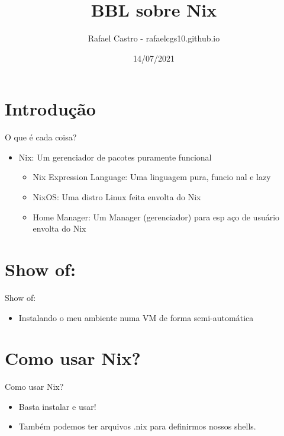 \documentclass[presentation]{beamer}
\author{Rafael Castro - rafaelcgs10.github.io}
\date{14/07/2021}
\title{BBL sobre Nix}
\begin{document}
\maketitle

\section{Introdução}
\label{sec:org8436435}

\begin{frame}[label={sec:org235ec10}]{O que é cada coisa?}
\begin{itemize}
\item Nix: Um gerenciador de pacotes \alert{puramente funcional}
\begin{itemize}
\item Nix Expression Language: Uma linguagem pura, funcio  nal e lazy
\item NixOS: Uma distro Linux feita envolta do Nix
\item Home Manager: Um Manager (gerenciador) para esp    aço de usuário   envolta do Nix
\end{itemize}
\end{itemize}
\end{frame}

\section{Show of:}
\label{sec:orgf655336}

\begin{frame}[label={sec:org1629316}]{Show of:}
\begin{itemize}
\item Instalando o meu ambiente numa VM de forma semi-automática
\end{itemize}
\end{frame}

\section{Como usar Nix?}
\label{sec:orged75924}

\begin{frame}[label={sec:org6c9e8aa}]{Como usar Nix?}
\begin{itemize}
\item Basta instalar e usar!
\item Também podemos ter arquivos .nix para definirmos nossos shells.
\end{itemize}
\end{frame}
\end{document}
